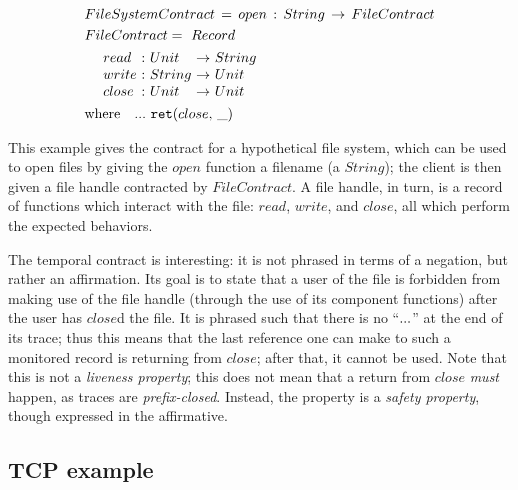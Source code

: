 \begin{align*}
 &FileSystemContract\, =\, open\, :\, String\, \to\, FileContract \\
 &FileContract =~ Record \\
 &\begin{array}{ @{\quad~}l@{\ :} @{~}l@{\ \to\ } l }
  read & Unit & String \\
  write & String & Unit \\
  close & Unit & Unit
 \end{array} \\
 &\text{where}\quad \sddd~ \ret{close}
\end{align*}

This example gives the contract for a hypothetical file system, which can be used to open files by giving the $open$ function a filename (a $String$); the client is then given a file handle contracted by $FileContract$.
%
A file handle, in turn, is a record of functions which interact with the file: $read$, $write$, and $close$, all which perform the expected behaviors.

The temporal contract is interesting: it is not phrased in terms of a negation, but rather an affirmation.
%
Its goal is to state that a user of the file is forbidden from making use of the file handle (through the use of its component functions) after the user has $close$d the file.
%
It is phrased such that there is no ``${\tt ...}$'' at the end of its trace; thus this means that the last reference one can make to such a monitored record is returning from $close$; after that, it cannot be used.
%
Note that this is not a \emph{liveness property}; this does not mean that a return from $close$ \emph{must} happen, as traces are \emph{prefix-closed}.
%
Instead, the property is a \emph{safety property}, though expressed in the affirmative.

\subsection{TCP example} \label{sec:tcp}

